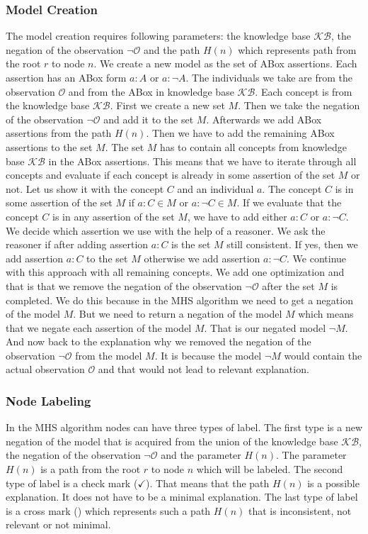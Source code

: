 \documentclass[12pt,a4paper]{article}
\newcommand{\xmark}{\ding{53}}
\begin{document}
\subsubsection{Model Creation}
\label{subsubsection:modelCreation}
The model creation requires following parameters: the knowledge base $\mathcal{KB}$, the negation of the observation $\neg \mathcal{O}$ and the path $H(n)$ which represents path from the root $r$ to node $n$. We create a new model as the set of ABox assertions. Each assertion has an ABox form $a:A$ or $a:\neg A$. The individuals we take are from the observation $\mathcal{O}$ and from the ABox in knowledge base $\mathcal{KB}$. Each concept is from the knowledge base $\mathcal{KB}$. First we create a new set $M$. Then we take the negation of the observation $\neg \mathcal{O}$ and add it to the set $M$. Afterwards we add ABox assertions from the path $H(n)$. Then we have to add the remaining ABox assertions to the set $M$. The set $M$ has to contain all concepts from knowledge base $\mathcal{KB}$ in the ABox assertions. This means that we have to iterate through all concepts and evaluate if each concept is already in some assertion of the set $M$ or not. Let us show it with the concept $C$ and an individual $a$. The concept $C$ is in some assertion of the set $M$ if $a:C \in M$ or $a:\neg C \in M$. If we evaluate that the concept $C$ is in any assertion of the set $M$, we have to add either $a:C$ or $a:\neg C$. We decide which assertion we use with the help of a reasoner. We ask the reasoner if after adding assertion $a:C$ is the set $M$ still consistent. If yes, then we add assertion $a:C$ to the set $M$ otherwise we add assertion $a:\neg C$. We continue with this approach with all remaining concepts. We add one optimization and that is that we remove the negation of the observation $\neg \mathcal{O}$ after the set $M$ is completed. We do this because in the MHS algorithm we need to get a negation of the model $M$. But we need to return a negation of the model $M$ which means that we negate each assertion of the model $M$. That is our negated model $\neg M$. And now back to the explanation why we removed the negation of the observation $\neg \mathcal{O}$ from the model $M$. It is because the model $\neg M$ would contain the actual observation $\mathcal{O}$ and that would not lead to relevant explanation.

\subsubsection{Node Labeling}
\label{subsubsection:nodeLabeling}
In the MHS algorithm nodes can have three types of label. The first type is a new negation of the model that is acquired from the union of the knowledge base $\mathcal{KB}$, the negation of the observation $\neg \mathcal{O}$ and the parameter $H(n)$. The parameter $H(n)$ is a path from the root $r$ to node $n$ which will be labeled. The second type of label is a check mark ($\checkmark$). That means that the path $H(n)$ is a possible explanation. It does not have to be a minimal explanation. The last type of label is a cross mark (\xmark) which represents such a path $H(n)$ that is inconsistent, not relevant or not minimal.
\end{document}
